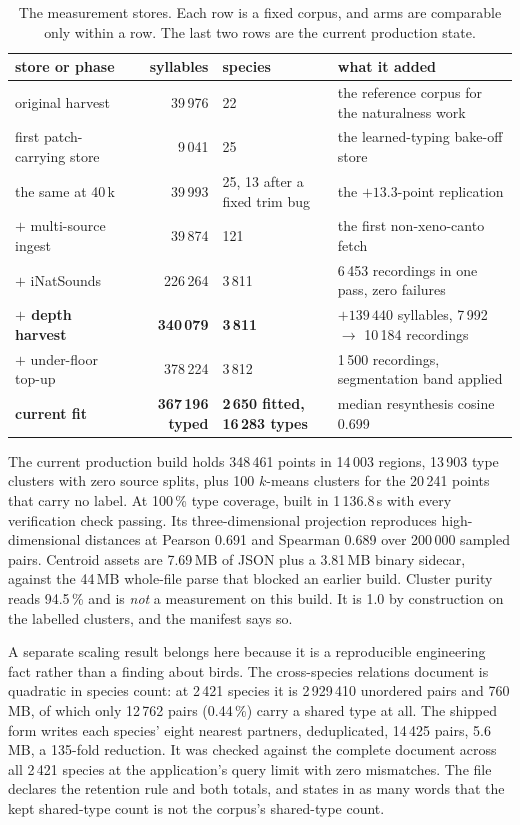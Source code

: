 \documentclass[10pt,twocolumn,a4paper]{article}
\begin{document}
\begin{table}[t]
\centering
\small
\caption{The measurement stores. Each row is a fixed corpus, and arms are comparable only
within a row. The last two rows are the current production state.}
\label{tab:stores}
\begin{tabular}{L{4.8cm} r L{3.0cm} L{4.4cm}}
\toprule
store or phase & syllables & species & what it added \\
\midrule
original harvest & 39\,976 & 22 & the reference corpus for the naturalness work \\
first patch-carrying store & 9\,041 & 25 & the learned-typing bake-off store \\
the same at 40\,k & 39\,993 & 25, 13 after a fixed trim bug & the $+13.3$-point replication \\
$+$ multi-source ingest & 39\,874 & 121 & the first non-xeno-canto fetch \\
$+$ iNatSounds & 226\,264 & 3\,811 & 6\,453 recordings in one pass, zero failures \\
\textbf{$+$ depth harvest} & \textbf{340\,079} & \textbf{3\,811} & $+139\,440$ syllables, 7\,992 $\to$ 10\,184 recordings \\
$+$ under-floor top-up & 378\,224 & 3\,812 & 1\,500 recordings, segmentation band applied \\
\textbf{current fit} & \textbf{367\,196 typed} & \textbf{2\,650 fitted, 16\,283 types} & median resynthesis cosine 0.699 \\
\bottomrule
\end{tabular}
\end{table}

The current production build holds 348\,461 points in 14\,003 regions, 13\,903 type
clusters with zero source splits, plus 100 $k$-means clusters for the 20\,241 points that
carry no label. At 100\,\% type coverage, built in 1\,136.8\,s with every verification
check passing. Its three-dimensional projection reproduces high-dimensional distances at
Pearson 0.691 and Spearman 0.689 over 200\,000 sampled pairs. Centroid assets are 7.69\,MB of
JSON plus a 3.81\,MB binary sidecar, against the 44\,MB whole-file parse that blocked an
earlier build. Cluster purity reads 94.5\,\% and is \emph{not} a measurement on this build.
It is 1.0 by construction on the labelled clusters, and the manifest says so.

A separate scaling result belongs here because it is a reproducible engineering fact rather
than a finding about birds. The cross-species relations document is quadratic in species
count: at 2\,421 species it is 2\,929\,410 unordered pairs and 760\,MB, of which only 12\,762
pairs (0.44\,\%) carry a shared type at all. The shipped form writes each species' eight
nearest partners, deduplicated, 14\,425 pairs, 5.6\,MB, a 135-fold reduction. It was
checked against the complete document across all 2\,421 species at the application's query
limit with zero mismatches. The file declares the retention rule and both totals, and states
in as many words that the kept shared-type count is not the corpus's shared-type count.
\end{document}

